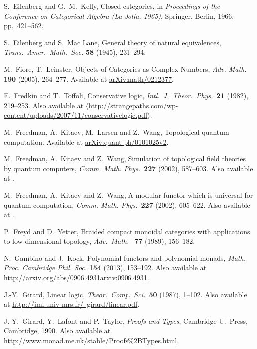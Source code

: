\documentclass[12pt,twoside,openright]{report}
\begin{document}
\begin{thebibliography}{99}
S.\ Eilenberg and G.\ M.\ Kelly, Closed categories, in
{\sl Proceedings of the Conference on Categorical Algebra (La Jolla, 
1965)}, Springer, Berlin, 1966, pp.\ 421--562.

S.\ Eilenberg and S.\ Mac Lane, General theory of natural equivalences, \textsl{Trans.\ Amer.\ Math.\ Soc.} 
\textbf{58} (1945), 231--294.

 M.\ Fiore, T.\ Leinster, Objects of Categories as Complex Numbers, \textsl{Adv. Math.} \textbf{190} (2005), 264--277.  Available at \href{http://arxiv.org/abs/math/0212377}{arXiv:math/0212377}.

 E.\ Fredkin and T.\ Toffoli, Conservative logic, 
\textit{Intl.\ J.\ Theor.\ Phys.\ }\textbf{21} (1982), 219--253. Also available at 
\hfill \break
\href{http://strangepaths.com/wp-content/uploads/2007/11/conservativelogic.pdf}
{$\langle$http://strangepaths.com/wp-content/uploads/2007/11/conservativelogic.pdf$\rangle$}.

 M.\ Freedman, A.\ Kitaev, M.\ Larsen and Z.\ Wang, Topological quantum computation.  Available at \href{http://arxiv.org/abs/quant-ph/0101025}{  arXiv:quant-ph/0101025v2}.

 M.\ Freedman, A.\ Kitaev and Z.\ Wang, Simulation of topological field theories by quantum computers, {\sl Comm. Math. Phys.\ }{\bf 227}
(2002), 587--603.  Also available at .

M.\ Freedman, A.\ Kitaev and Z.\ Wang, A modular functor which is universal for quantum computation, {\sl Comm. Math. Phys.\ }{\bf 227}
(2002), 605--622.  Also available at .

P.\ Freyd and D.\ Yetter, Braided compact monoidal categories with applications to low dimensional topology,
\textsl{Adv.\ Math.\ } {\bf 77} (1989), 156--182.

 N.\ Gambino and J.\ Kock, Polynomial functors and polynomial monads,
{\sl Math. Proc. Cambridge Phil. Soc.} \textbf{154} (2013), 153--192. Also available at {http://arxiv.org/abs/0906.4931}{arxiv:0906.4931}.

 J.-Y.\ Girard, Linear logic, {\sl Theor.\ Comp.\ 
Sci.\ }{\bf 50} (1987), 1--102.  Also available at \hfill \break
\href{http://iml.univ-mrs.fr/~girard/linear.pdf}
{http://iml.univ-mrs.fr/~girard/linear.pdf}.

 J.-Y.\ Girard, Y.\ Lafont and P.\ Taylor, {\sl Proofs and Types}, Cambridge U.\ Press, Cambridge, 1990. Also available at \href{http://www.monad.me.uk/stable/Proofs\%2BTypes.html}
{http://www.monad.me.uk/stable/Proofs\%2BTypes.html}.


\end{thebibliography}
\end{document}
